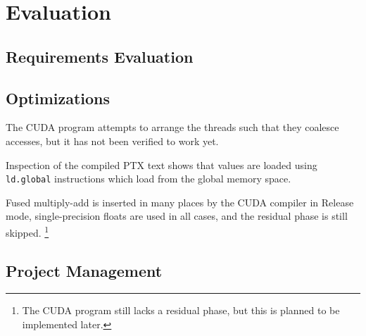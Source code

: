 
\chapter{Evaluation}

\section{Requirements Evaluation}





\section{Optimizations}
The CUDA program attempts to arrange the threads such that they coalesce accesses, but it has not been verified to work yet.

Inspection of the compiled PTX text shows that values are loaded using \texttt{ld.global} instructions which load from the global memory space.

Fused multiply-add is inserted in many places by the CUDA compiler in Release mode, single-precision floats are used in all cases, and the residual phase is still skipped.
\footnote{The CUDA program still lacks a residual phase, but this is planned to be implemented later.\label{sec:OptimizationReAddingResidual}}


\section{Project Management}



